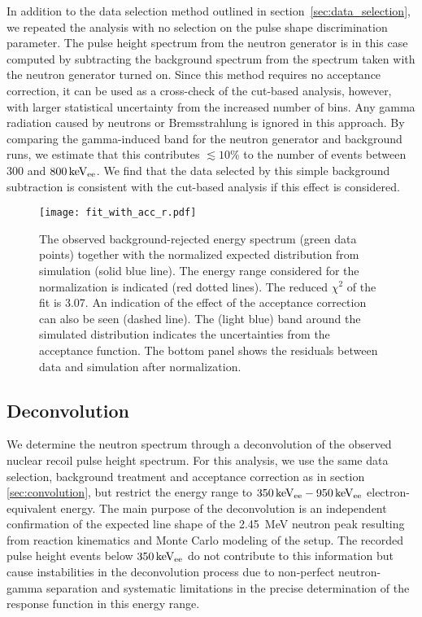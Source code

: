 In addition to the data selection method outlined in section~\ref{sec:data_selection}, we repeated the analysis with no selection on the pulse shape discrimination parameter. The pulse height spectrum from the neutron generator is in this case computed by subtracting the background spectrum from the spectrum taken with the neutron generator turned on. Since this method requires no acceptance correction, it can be used as a cross-check of the cut-based analysis, however, with larger statistical uncertainty from the increased number of bins. Any gamma radiation caused by neutrons or Bremsstrahlung is ignored in this approach. By comparing the gamma-induced band for the neutron generator and background runs, we estimate that this contributes $\lesssim 10$\% to the number of events between \num{300} and $800\, \mathrm{keV_{ee}}$. We find that the data selected by this simple background subtraction is consistent with the cut-based analysis if this effect is considered.

\begin{figure}[!htbp]
\begin{center}
\texttt{[image: fit\_with\_acc\_r.pdf]}
\caption{The observed background-rejected energy spectrum (green data points) together with the normalized expected distribution from simulation (solid blue line). The energy range considered for the normalization is indicated (red dotted lines). The reduced $\chi^2$ of the fit is 3.07. An indication of the effect of the acceptance correction can also be seen (dashed line). The (light blue) band around the simulated distribution indicates the uncertainties from the acceptance function. The bottom panel shows the residuals between data and simulation after normalization. }
\label{fit_with_acc}
\end{center}
\end{figure}

\subsection{Deconvolution}\label{sec:deconvolution}
We determine the neutron spectrum through a deconvolution of  the observed nuclear recoil pulse height spectrum. For this analysis, we use the same data selection, background treatment and acceptance correction as in section \ref{sec:convolution}, but restrict the energy range to $350\, \mathrm{keV_{ee}}-950\, \mathrm{keV_{ee}}$ electron-equivalent energy.
The main purpose of the deconvolution is an independent confirmation of the expected line shape of the \SI{2.45}{MeV} neutron peak resulting from reaction kinematics and Monte Carlo modeling of the setup. The recorded pulse height events below $350\, \mathrm{keV_{ee}}$ do not contribute to this information but cause instabilities in the deconvolution process due to non-perfect neutron-gamma separation and systematic limitations in the precise determination of the response function in this energy range.

